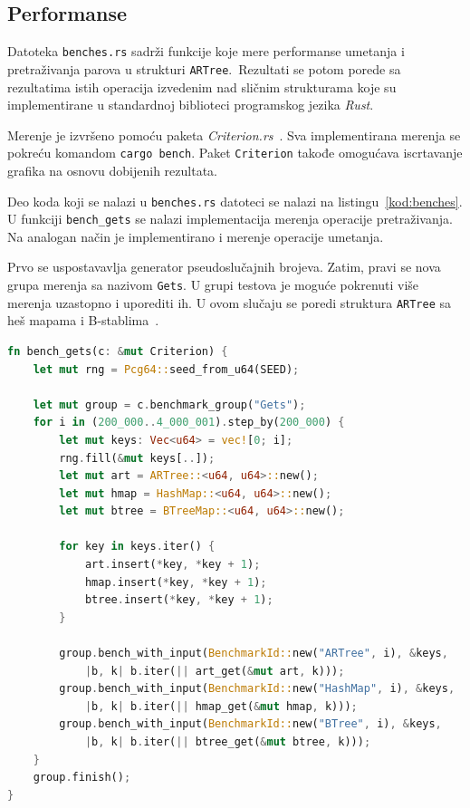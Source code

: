\documentclass[12pt,oneside]{memoir}
\begin{document}
\subsection{Performanse}
Datoteka \texttt{benches.rs} sadrži funkcije koje mere
performanse umetanja i pretraživanja parova u
strukturi \texttt{ARTree}.\
Rezultati se potom porede sa rezultatima istih operacija
izvedenim nad sličnim strukturama koje su implementirane u standardnoj
biblioteci programskog jezika \textit{Rust}.

Merenje je izvršeno pomoću paketa \textit{Criterion.rs}~\cite{criterion}.
Sva implementirana merenja se pokreću komandom \texttt{cargo bench}.
Paket \texttt{Criterion} takođe
omogućava iscrtavanje grafika na osnovu dobijenih rezultata.

Deo koda koji se nalazi u \texttt{benches.rs} datoteci se nalazi na
listingu~\ref{kod:benches}. U funkciji \texttt{bench\_gets} se nalazi
implementacija merenja operacije pretraživanja.
Na analogan način je implementirano i merenje operacije umetanja.

Prvo se uspostavavlja generator pseudoslučajnih brojeva. Zatim,
pravi se nova grupa merenja sa nazivom \texttt{Gets}. U grupi testova
je moguće pokrenuti više merenja uzastopno i uporediti ih.
U ovom slučaju se poredi struktura \texttt{ARTree} sa heš mapama i
B-stablima~\cite{btree}.

\begin{lstlisting}[language=Rust,
                   caption={Funkcija \texttt{bench\_gets}},
                   label={kod:benches}]
fn bench_gets(c: &mut Criterion) {
    let mut rng = Pcg64::seed_from_u64(SEED);

    let mut group = c.benchmark_group("Gets");
    for i in (200_000..4_000_001).step_by(200_000) {
        let mut keys: Vec<u64> = vec![0; i];
        rng.fill(&mut keys[..]);
        let mut art = ARTree::<u64, u64>::new();
        let mut hmap = HashMap::<u64, u64>::new();
        let mut btree = BTreeMap::<u64, u64>::new();

        for key in keys.iter() {
            art.insert(*key, *key + 1);
            hmap.insert(*key, *key + 1);
            btree.insert(*key, *key + 1);
        }

        group.bench_with_input(BenchmarkId::new("ARTree", i), &keys,
            |b, k| b.iter(|| art_get(&mut art, k)));
        group.bench_with_input(BenchmarkId::new("HashMap", i), &keys,
            |b, k| b.iter(|| hmap_get(&mut hmap, k)));
        group.bench_with_input(BenchmarkId::new("BTree", i), &keys,
            |b, k| b.iter(|| btree_get(&mut btree, k)));
    }
    group.finish();
}

\end{lstlisting}
\end{document}
